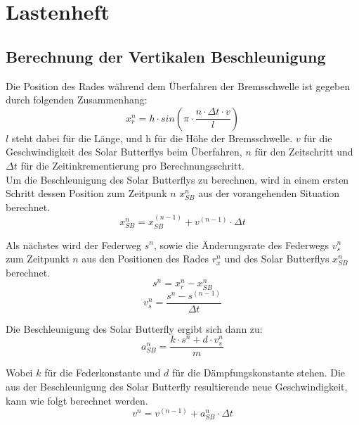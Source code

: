 \section{Lastenheft}
  \subsection{Berechnung der Vertikalen Beschleunigung}
  \label{Vertikale Beschleunigung}
  Die Position des Rades während dem Überfahren der Bremsschwelle ist gegeben durch folgenden Zusammenhang:
  \begin{equation}
    x_r^n = h \cdot sin\left(\pi \cdot \frac{n \cdot \Delta t \cdot v}{l}\right)
  \end{equation}
  $l$ steht dabei für die Länge, und h für die Höhe der Bremsschwelle. $v$ für die Geschwindigkeit des Solar Butterflys beim Überfahren, $n$ für den Zeitschritt und $\Delta t$ für die Zeitinkrementierung pro Berechnungsschritt.\\

  Um die Beschleunigung des Solar Butterflys zu berechnen, wird in einem ersten Schritt dessen Position zum Zeitpunk $n$ $x_{SB}^n$ aus der vorangehenden Situation berechnet.
  \begin{equation}
    x_{SB}^n = x_{SB}^{(n-1)} + v^{(n-1)} \cdot \Delta t
  \end{equation}

  Als nächstes wird der Federweg $s^n$, sowie die Änderungsrate des Federwegs $v_s^n$ zum Zeitpunkt $n$ aus den Positionen des Rades $r_x^n$ und des Solar Butterflys $x_{SB}^n$ berechnet.
  \begin{equation}
    s^n = x_r^n - x_{SB}^n
  \end{equation}
  \begin{equation}
    v_s^n = \frac{s^n - s^{(n-1)}}{\Delta t}
  \end{equation}

  Die Beschleunigung des Solar Butterfly ergibt sich dann zu:\\
  \begin{equation}
    a_{SB}^n = \frac{k \cdot s^n + d \cdot v_s^n}{m}
  \end{equation}

  Wobei $k$ für die Federkonstante und $d$ für die Dämpfungskonstante stehen.
  Die aus der Beschleunigung des Solar Butterfly resultierende neue Geschwindigkeit, kann wie folgt berechnet werden.
  \begin{equation}
    v^n = v^{(n-1)} + a_{SB}^n \cdot \Delta t
  \end{equation}



